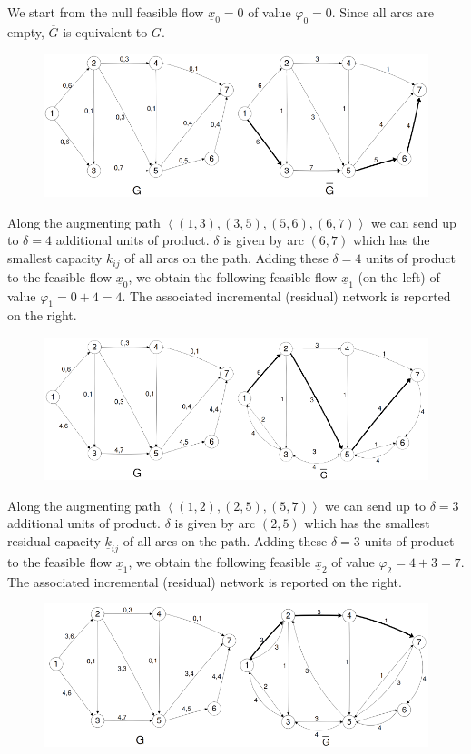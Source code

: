 \documentclass[12pt, a4paper]{report}
\newtheorem[style=M,bodystyle=\normalfont]{theorem}{Theorem}
\newtheorem[style=M,bodystyle=\normalfont]{corollary}{Corollary}
\newtheorem[style=M,bodystyle=\normalfont]{lemma}{Lemma}
\newtheorem[style=M,bodystyle=\normalfont]{definition}{Definition}
\begin{document}
        We start from the null feasible flow $\underline{x}_0=0$ of value $\varphi_0 = 0$. Since all arcs are empty, $\overline{G}$ is equivalent to $G$.
        \begin{figure}[H]
            \centering
            \includegraphics[width=0.9\linewidth]{images/maxcut1.png}
        \end{figure}
        Along the augmenting path $\left\langle (1, 3),(3, 5),(5, 6),(6, 7)\right\rangle $ we can send up to $\delta = 4$ additional units of product. $\delta$ is given 
        by arc $(6, 7)$ which has the smallest capacity $k_{ij}$ of all arcs on the path. Adding these $\delta=4$ units of product to the feasible flow $\underline{x}_0$, 
        we obtain the following feasible flow $\underline{x}_1$ (on the left) of value $\varphi_1 = 0 + 4 = 4$. The associated incremental (residual) network is reported 
        on the right.
        \begin{figure}[H]
            \centering
            \includegraphics[width=0.9\linewidth]{images/maxcut2.png}
        \end{figure}
        Along the augmenting path $\left\langle (1, 2),(2, 5),(5, 7)\right\rangle $ we can send up to $\delta = 3$ additional units of product. $\delta$ is given by arc 
        $(2, 5)$ which has the smallest residual capacity $\underline{k}_{ij}$ of all arcs on the path. Adding these $\delta = 3$ units of product to the feasible flow 
        $\underline{x}_1$, we obtain the following feasible $\underline{x}_2$ of value $\varphi_2 = 4 + 3 = 7$. The associated incremental (residual) network is reported 
        on the right.
        \begin{figure}[H]
            \centering
            \includegraphics[width=0.9\linewidth]{images/maxcut3.png}
        \end{figure}
\end{document}
